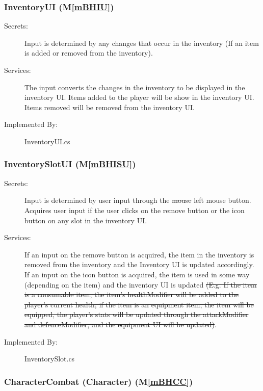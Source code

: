 \documentclass[12pt, titlepage]{article}
\newcommand{\mref}[1]{M\ref{#1}}
\begin{document}
\subsubsection{InventoryUI (\mref{mBHIU})}

\begin{description}
\item[Secrets:] Input is determined by any changes that occur in the inventory (If an item is added or removed from the inventory). 
\item[Services:] The input converts the changes in the inventory to be displayed in the inventory UI. {\color {magenta} Items added to the player will be show in the inventory UI. Items removed will be removed from the inventory UI.}
\item[Implemented By:] InventoryUI.cs
\end{description}

\subsubsection{InventorySlotUI (\mref{mBHISU})}

\begin{description}
\item[Secrets:] Input is determined by user input through the \sout{mouse} {\color {magenta} left mouse button}. Acquires user input if the user clicks on the remove button or the icon button on any slot in the inventory UI.
\item[Services:] If an input on the remove button is acquired, the item in the inventory is removed from the inventory and the Inventory UI is updated accordingly. If an input on the icon button is acquired, the item is used in some way (depending on the item) and the inventory UI is updated \sout{(E.g. If the item is a consumable item, the item's healthModifier will be added to the player's current health; if the item is an equipment item, the item will be equipped, the player's stats will be updated through the attackModifier and defenceModifier,  and the equipment UI will be updated)}.
\item[Implemented By:] InventorySlot.cs
\end{description}

\subsubsection{CharacterCombat (Character) (\mref{mBHCC})}
\end{document}
